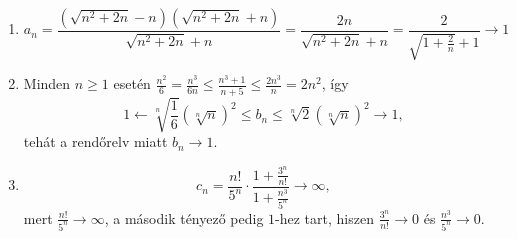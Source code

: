 \documentclass[11pt]{scrartcl}
\begin{document}
\begin{enumerate}
	\item \[
		      a_n
		      = \frac{\left(\sqrt{n^2 + 2n} - n\right)\left(\sqrt{n^2 + 2n} + n\right)}{\sqrt{n^2 + 2n} + n}
		      = \frac{2n}{\sqrt{n^2 + 2n} + n}
		      = \frac{2}{\sqrt{1 + \frac{2}{n}} + 1}
		      \to 1
	      \]

	\item Minden $n \ge 1$ esetén
	      \(
	      \frac{n^2}{6} = \frac{n^3}{6n} \le \frac{n^3 + 1}{n + 5} \le \frac{2n^3}{n} = 2n^2
	      \),
	      így
	      \[
		      1
		      \leftarrow \sqrt[n]{\frac{1}{6}} \left(\sqrt[n]{n}\right)^2
		      \le b_n
		      \le \sqrt[n]{2} \left(\sqrt[n]{n}\right)^2
		      \to 1,
	      \]
	      tehát a rendőrelv miatt $b_n \to 1$.

	\item \[
		      c_n
		      = \frac{n!}{5^n} \cdot
		      \frac{1 + \frac{3^n}{n!}}{1 + \frac{n^3}{5^n}}
		      \to \infty,
	      \]
	      mert $\frac{n!}{5^n} \to \infty$, a második tényező pedig $1$-hez
	      tart, hiszen $\frac{3^n}{n!} \to 0$ és $\frac{n^3}{5^n} \to 0$.
\end{enumerate}
\end{document}
